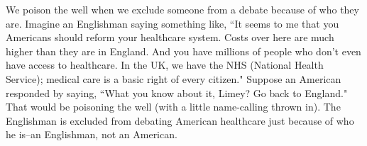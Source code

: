We poison the well when we exclude someone from a debate because of who they are. Imagine an
Englishman saying something like, ``It seems to me that you Americans should reform your
healthcare system. Costs over here are much higher than they are in England. And you have
millions of people who don't even have access to healthcare. In the UK, we have the NHS
(National Health Service); medical care is a basic right of every citizen." Suppose an American
responded by saying, ``What you know about it, Limey? Go back to England." That would be
poisoning the well (with a little name-calling thrown in). The Englishman is excluded from
debating American healthcare just because of who he is--an Englishman, not an American.

